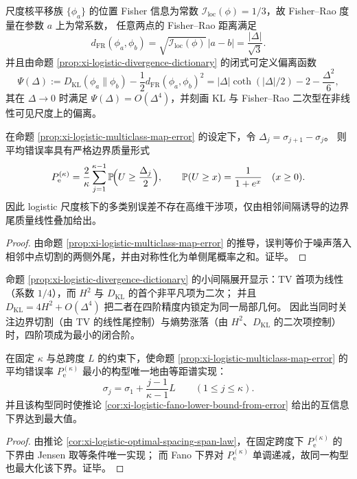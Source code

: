 \begin{remark}\label{rem:xi-logistic-fisher-rao-and-curvature}
尺度核平移族 \(\{\phi_a\}\) 的位置 Fisher 信息为常数 \(\mathcal I_{\mathrm{loc}}(\phi)=1/3\)，故 Fisher--Rao 度量在参数 \(a\) 上为常系数，
任意两点的 Fisher--Rao 距离满足
\[
d_{\mathrm{FR}}(\phi_a,\phi_b)=\sqrt{\mathcal I_{\mathrm{loc}}(\phi)}\,|a-b|=\frac{|\Delta|}{\sqrt3}.
\]
并且由命题 \ref{prop:xi-logistic-divergence-dictionary} 的闭式可定义偏离函数
\[
\Psi(\Delta):=D_{\mathrm{KL}}(\phi_a\|\phi_b)-\frac{1}{2}d_{\mathrm{FR}}(\phi_a,\phi_b)^{2}
=|\Delta|\coth(|\Delta|/2)-2-\frac{\Delta^{2}}{6},
\]
其在 \(\Delta\to 0\) 时满足 \(\Psi(\Delta)=O(\Delta^{4})\)，并刻画 KL 与 Fisher--Rao 二次型在非线性可见尺度上的偏离。
\end{remark}

\begin{corollary}\label{cor:xi-logistic-boundary-mass-error}
在命题 \ref{prop:xi-logistic-multiclass-map-error} 的设定下，令 \(\Delta_j=\sigma_{j+1}-\sigma_j\)。
则平均错误率具有严格边界质量形式
\[
P_{\mathrm e}^{(\kappa)}
=\frac{2}{\kappa}\sum_{j=1}^{\kappa-1}\mathbb P\!\Bigl(U\ge \frac{\Delta_j}{2}\Bigr),
\qquad
\mathbb P(U\ge x)=\frac{1}{1+e^{x}}\quad(x\ge 0).
\]
因此 logistic 尺度核下的多类别误差不存在高维干涉项，仅由相邻间隔诱导的边界尾质量线性叠加给出。
\end{corollary}
\begin{proof}
由命题 \ref{prop:xi-logistic-multiclass-map-error} 的推导，误判等价于噪声落入相邻中点切割的两侧外尾，并由对称性化为单侧尾概率之和。证毕。
\end{proof}

\begin{remark}\label{rem:xi-logistic-fourth-order-closure}
命题 \ref{prop:xi-logistic-divergence-dictionary} 的小间隔展开显示：\(\mathrm{TV}\) 首项为线性（系数 \(1/4\)），而 \(H^{2}\) 与 \(D_{\mathrm{KL}}\) 的首个非平凡项为二次；
并且 \(D_{\mathrm{KL}}=4H^{2}+O(\Delta^{4})\) 把二者在四阶精度内锁定为同一局部几何。
因此当同时关注边界切割（由 \(\mathrm{TV}\) 的线性尾控制）与熵势涨落（由 \(H^{2}\)、\(D_{\mathrm{KL}}\) 的二次项控制）时，四阶项成为最小的闭合阶。
\end{remark}

\begin{corollary}\label{cor:xi-logistic-depth-design-law}
在固定 \(\kappa\) 与总跨度 \(L\) 的约束下，使命题 \ref{prop:xi-logistic-multiclass-map-error} 的平均错误率 \(P_{\mathrm e}^{(\kappa)}\) 最小的构型唯一地由等距谱实现：
\[
\sigma_j=\sigma_1+\frac{j-1}{\kappa-1}L\qquad(1\le j\le\kappa).
\]
并且该构型同时使推论 \ref{cor:xi-logistic-fano-lower-bound-from-error} 给出的互信息下界达到最大值。
\end{corollary}
\begin{proof}
由推论 \ref{cor:xi-logistic-optimal-spacing-span-law}，在固定跨度下 \(P_{\mathrm e}^{(\kappa)}\) 的下界由 Jensen 取等条件唯一实现；
而 Fano 下界对 \(P_{\mathrm e}^{(\kappa)}\) 单调递减，故同一构型也最大化该下界。证毕。
\end{proof}

